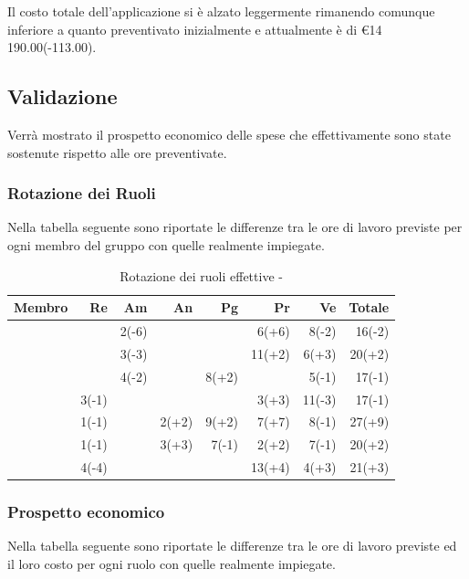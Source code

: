 \documentclass[12pt,a4paper]{article}
\begin{document}
\par Il costo totale dell'applicazione si è alzato leggermente rimanendo comunque inferiore a quanto preventivato inizialmente e attualmente è di \euro{}14 190.00(-113.00).

\newpage

\subsection{Validazione}
Verrà mostrato il prospetto economico delle spese che effettivamente sono state sostenute rispetto alle ore preventivate.

\subsubsection{Rotazione dei Ruoli}
Nella tabella seguente sono riportate le differenze tra le ore di lavoro previste per ogni membro del gruppo con quelle realmente impiegate.

\begin{table}[H]
	\begin{center}
		\begin{tabular}{l r r r r r r r}
\toprule
\textbf{Membro}	&	\textbf{Re}	&	\textbf{Am}	& \textbf{An} 	& \textbf{Pg} 	& \textbf{Pr} 	& \textbf{Ve} 	& \textbf{Totale}\\
\midrule
\midrule
\IB{} 			& 				& 2(-6)			& 				& 				& 6(+6)			& 8(-2) 		& 16(-2) \\
\midrule
\AB{} 			& 				& 3(-3)			& 				& 				& 11(+2)		& 6(+3)			& 20(+2) \\
\midrule
\NDC{} 			& 				& 4(-2)			& 				& 8(+2)			& 				& 5(-1)			& 17(-1) \\
\midrule
\TP{} 			& 3(-1)			& 				& 				& 				& 3(+3)			& 11(-3)		& 17(-1) \\
\midrule
\WS{} 			& 1(-1)			& 				& 2(+2)			& 9(+2)			& 7(+7)			& 8(-1)			& 27(+9) \\
\midrule
\AVE{} 			& 1(-1)			& 				& 3(+3)			& 7(-1)			& 2(+2)			& 7(-1)			& 20(+2) \\
\midrule
\AVI{} 			& 4(-4)			& 				& 				& 				& 13(+4)		& 4(+3)			& 21(+3) \\
\bottomrule
		\end{tabular}
		\caption{Rotazione dei ruoli effettive - \FVV{}}
	\end{center}
\end{table}

\subsubsection{Prospetto economico}
Nella tabella seguente sono riportate le differenze tra le ore di lavoro previste ed il loro costo per ogni ruolo con quelle realmente impiegate.
\end{document}
